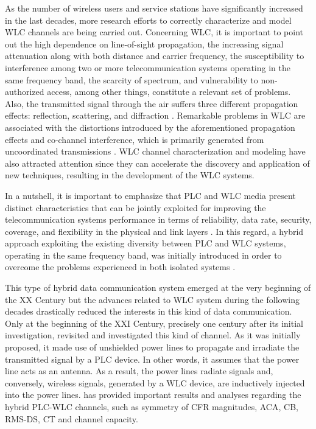 \documentclass[journal]{IEEEtran}
\begin{document}
As the number of wireless users and service stations have significantly increased in the last decades, more research efforts to correctly characterize and model \ac{WLC} channels are being carried out. Concerning \ac{WLC}, it is important to point out the high dependence on line-of-sight propagation, the increasing signal attenuation along with both distance and carrier frequency, the susceptibility to interference among two or more telecommunication systems operating in the same frequency band, the scarcity of spectrum, and vulnerability to non-authorized access, among other things, constitute a relevant set of problems. Also, the transmitted signal through the air suffers three different propagation effects: reflection, scattering, and diffraction \cite{Guze}. Remarkable problems in \ac{WLC} are associated with the distortions introduced by the aforementioned propagation effects and co-channel interference, which is primarily generated from uncoordinated transmissions \cite{Sayed2015}. \ac{WLC} channel characterization and modeling have also attracted attention since they can accelerate the discovery and application of new techniques, resulting in the development of the \ac{WLC} systems. 

In a nutshell, it is important to emphasize that \ac{PLC} and \ac{WLC} media present distinct characteristics that can be jointly exploited for improving the telecommunication systems performance in terms of reliability, data rate, security, coverage, and flexibility in the physical and link layers \cite{Dib,Victor2017,Victor2018}. In this regard, a hybrid approach exploiting the existing diversity between \ac{PLC} and \ac{WLC} systems, operating in the same frequency band, was initially introduced in order to overcome the problems experienced in both isolated systems \cite{thiago:hyb, thiago:hyb2, Victor2016, Leo2016}.

This type of hybrid data communication system emerged at the very beginning of the XX Century \cite{Mischa} but the advances related to \ac{WLC} system during the following decades drastically reduced the interests in this kind of data communication. Only at the beginning of the XXI Century, precisely one century after its initial investigation, \cite{thiago:hyb} revisited and investigated this kind of channel. As it was initially proposed, it made use of unshielded power lines to propagate and irradiate the transmitted signal by a \ac{PLC} device. In other words, it assumes that the power line acts as an antenna. As a result, the power lines radiate signals and, conversely, wireless signals, generated by a \ac{WLC} device, are inductively injected into the power lines. \cite{thiago:hyb} has provided important results and analyses regarding the hybrid \ac{PLC}-\ac{WLC} channels, such as symmetry of \ac{CFR} magnitudes, \ac{ACA}, \ac{CB}, \ac{RMS-DS}, \ac{CT} and channel capacity.
\end{document}
